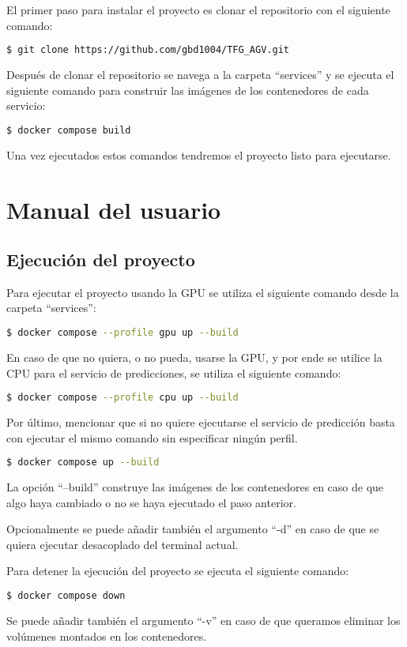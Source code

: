 El primer paso para instalar el proyecto es clonar el repositorio con el siguiente comando:
\begin{lstlisting}[language=bash]
$ git clone https://github.com/gbd1004/TFG_AGV.git
\end{lstlisting}
Después de clonar el repositorio se navega a la carpeta ``services'' y se ejecuta el siguiente 
comando para construir las imágenes de los contenedores de cada servicio:
\begin{lstlisting}[language=bash]
$ docker compose build
\end{lstlisting}

Una vez ejecutados estos comandos tendremos el proyecto listo para ejecutarse.

\section{Manual del usuario}

\subsection{Ejecución del proyecto}

Para ejecutar el proyecto usando la GPU se utiliza el siguiente comando desde la carpeta ``services'':
\begin{lstlisting}[language=bash]
$ docker compose --profile gpu up --build
\end{lstlisting}
En caso de que no quiera, o no pueda, usarse la GPU, y por ende se utilice la CPU para el servicio de 
predicciones, se utiliza el siguiente comando:
\begin{lstlisting}[language=bash]
$ docker compose --profile cpu up --build
\end{lstlisting}
Por último, mencionar que si no quiere ejecutarse el servicio de predicción basta con ejecutar el mismo comando 
sin especificar ningún perfil.
\begin{lstlisting}[language=bash]
$ docker compose up --build
\end{lstlisting}

La opción ``--build'' construye las imágenes de los contenedores en caso de que algo haya cambiado o 
no se haya ejecutado el paso anterior.

Opcionalmente se puede añadir también el argumento ``-d'' en caso de que se quiera ejecutar desacoplado 
del terminal actual.

Para detener la ejecución del proyecto se ejecuta el siguiente comando:
\begin{lstlisting}[language=bash]
$ docker compose down
\end{lstlisting}
Se puede añadir también el argumento ``-v'' en caso de que queramos eliminar los volúmenes montados 
en los contenedores.

